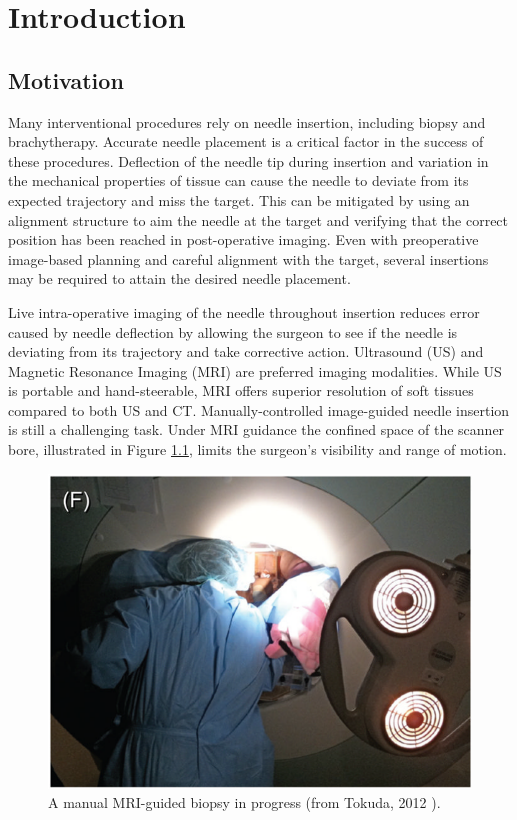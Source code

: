 \chapter{Introduction}
\label{sec:intro} %
\section{Motivation}
Many interventional procedures rely on needle insertion, including biopsy and brachytherapy\cite{bomers_mri-guided_2012}. Accurate needle placement is a critical factor in the success of these procedures\cite{nath_dosimetric_2000, youk_missed_2007}. Deflection of the needle tip during insertion and variation in the mechanical properties of tissue can cause the needle to deviate from its expected trajectory and miss the target. This can be mitigated by using an alignment structure to aim the needle at the target and verifying that the correct position has been reached in post-operative imaging\cite{tokuda_-bore_2012}. Even with preoperative image-based planning and careful alignment with the target, several insertions may be required to attain the desired needle placement\cite{onik_ct-guided_1988}. 

Live intra-operative imaging of the needle throughout insertion reduces error caused by needle deflection by allowing the surgeon to see if the needle is deviating from its trajectory and take corrective action. Ultrasound (US) and Magnetic Resonance Imaging (MRI) are preferred imaging modalities. While US is portable and hand-steerable, MRI offers superior resolution of soft tissues compared to both US and CT\cite{weiss_mr-guided_2008}. Manually-controlled image-guided needle insertion is still a challenging task. Under MRI guidance the confined space of the scanner bore, illustrated in Figure \ref{fig:mri_intraoperative}, limits the surgeon's visibility and range of motion\cite{damico_transperineal_2000, menard_mri_nodate}.

\begin{figure}[h]
\includegraphics[width=1.0\textwidth]{Fig/chap1/tokuda_action_shot.png}
\caption{A manual MRI-guided biopsy in progress (from Tokuda, 2012 \cite{tokuda_-bore_2012}).}
\label{fig:mri_intraoperative}
\end{figure}

